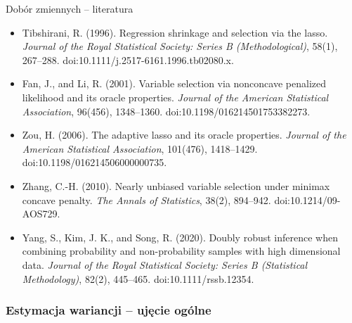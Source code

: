 \documentclass[10pt,ignorenonframetext, aspectratio=169]{beamer}
\begin{document}
\begin{frame}{Dobór zmiennych -- literatura}
\begin{itemize}
\scriptsize
    \item Tibshirani, R. (1996). Regression shrinkage and selection via the lasso. \textit{Journal of the Royal Statistical Society: Series B (Methodological)}, 58(1), 267--288. doi:10.1111/j.2517-6161.1996.tb02080.x.
    \item Fan, J., and Li, R. (2001). Variable selection via nonconcave penalized likelihood and its oracle properties. \textit{Journal of the American Statistical Association}, 96(456), 1348--1360. doi:10.1198/016214501753382273.
    \item Zou, H. (2006). The adaptive lasso and its oracle properties. \textit{Journal of the American Statistical Association}, 101(476), 1418--1429. doi:10.1198/016214506000000735.
    \item Zhang, C.-H. (2010). Nearly unbiased variable selection under minimax concave penalty. \textit{The Annals of Statistics}, 38(2), 894--942. doi:10.1214/09-AOS729.
    \item Yang, S., Kim, J. K., and Song, R. (2020). Doubly robust inference when combining probability and non-probability samples with high dimensional data. \textit{Journal of the Royal Statistical Society: Series B (Statistical Methodology)}, 82(2), 445--465. doi:10.1111/rssb.12354.
\end{itemize}
\end{frame}

\subsubsection{Estymacja wariancji -- ujęcie ogólne}
\end{document}
